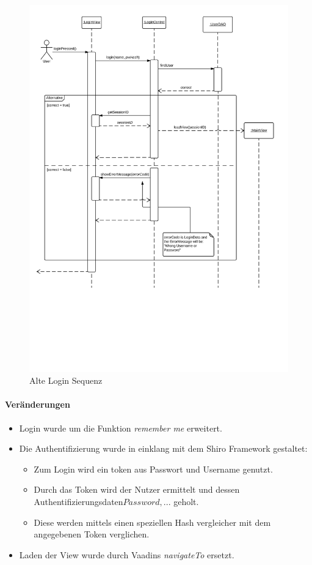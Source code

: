 \begin{figure}
  \centering
    \includegraphics[width=\linewidth]{Login-Sequenz.svg}
   \caption{Alte Login Sequenz}
\end{figure}

\paragraph{Veränderungen}
\begin{itemize}
    \item Login wurde um die Funktion \emph{remember me} erweitert.
    \item Die Authentifizierung wurde in einklang mit dem Shiro Framework gestaltet:
    \begin{itemize}
        \item Zum Login wird ein token aus Passwort und Username genutzt.
        \item Durch das Token wird der Nutzer ermittelt und dessen Authentifizierungsdaten\(Password, ...\) geholt.
        \item Diese werden mittels einen speziellen Hash vergleicher mit dem angegebenen Token verglichen.
    \end{itemize}
    \item Laden der View wurde durch Vaadins \emph{navigateTo} ersetzt.
\end{itemize}

